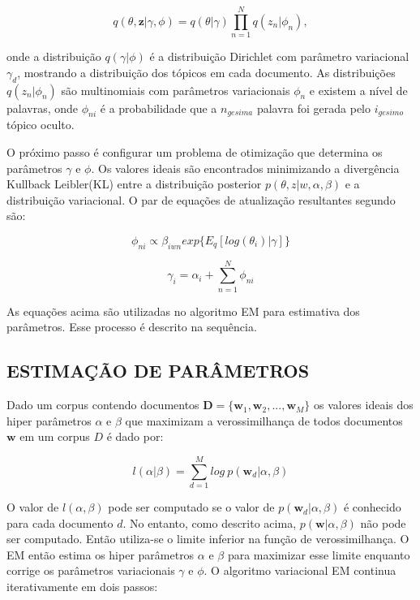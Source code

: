 \documentclass[12pt,a4paper]{article}
\begin{document}
\begin{equation}
q(\theta,\textbf{z}|\gamma,\phi)=q(\theta|\gamma)\prod_{n=1}^{N}q(z_n|\phi_n), 
\end{equation}

onde a distribuição  $q(\gamma|\phi)$ é a distribuição Dirichlet com parâmetro variacional $\gamma_d$, mostrando a distribuição dos tópicos em cada documento.
 As distribuições $q(z_n | \phi_n)$ são multinomiais com parâmetros variacionais $\phi_n$ e existem a nível de palavras, onde $\phi_{ni}$ é a probabilidade que a $n_{gesima}$ palavra foi gerada pelo $i_{gesimo}$ tópico oculto.

O próximo passo é configurar um problema de otimização que determina os parâmetros $\gamma$ e $\phi$. Os valores ideais são encontrados minimizando a divergência Kullback Leibler(KL) entre a distribuição posterior $p(\theta, z|w,\alpha,\beta)$ e a distribuição variacional.
 O par de equações de atualização resultantes segundo  são:

\begin{equation}
\phi_{ni} \propto \beta_{iwn} exp\{E_q[log(\theta_i)|\gamma]\}
\end{equation}

\begin{equation}
\gamma_i = \alpha_i + \sum_{n=1}^{N} \phi_{ni}
\end{equation}

As equações acima são utilizadas no algoritmo EM para estimativa dos parâmetros. Esse processo é descrito na sequência.

\subsection{ESTIMAÇÃO DE PARÂMETROS}
Dado um corpus contendo documentos $\textbf{D} = \{\textbf{w}_1, \textbf{w}_2, . . ., \textbf{w}_M\}$ os valores ideais dos hiper parâmetros $\alpha$ e $\beta$
 que maximizam a verossimilhança de todos documentos $\textbf{w}$ em um corpus $D$ é dado por:

\begin{equation}
l(\alpha|\beta) = \sum_{d=1}^{M} log\ p(\textbf{w}_d|\alpha,\beta)
\end{equation}

O valor de $l(\alpha, \beta)$ pode ser computado se o valor de $p(\textbf{w}_d|\alpha, \beta)$ é conhecido para cada documento $d$. No entanto,
 como descrito acima, $p(\textbf{w}|\alpha,\beta)$ não pode ser computado. Então utiliza-se o limite inferior na função de verossimilhança.
 O EM então estima os hiper parâmetros $\alpha$ e $\beta$ para maximizar esse limite enquanto corrige os parâmetros variacionais $\gamma$ e $\phi$. 
 O algoritmo variacional EM continua iterativamente em dois passos:
\end{document}
